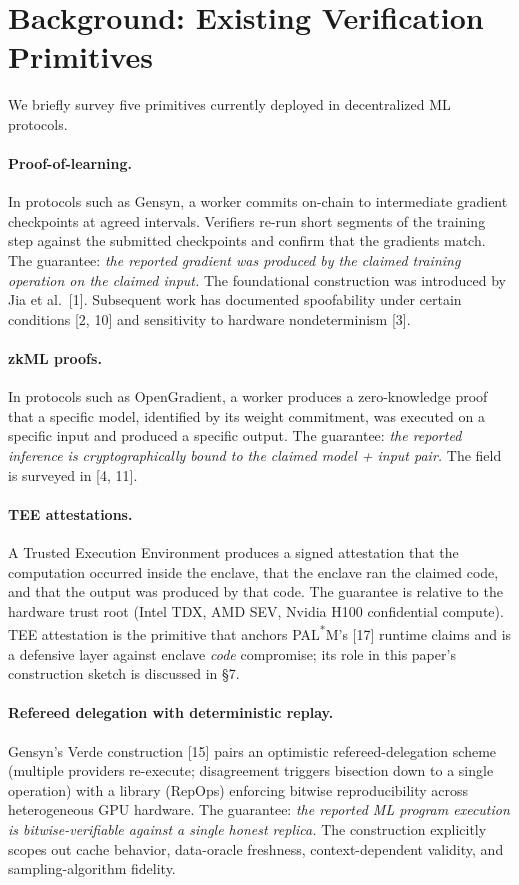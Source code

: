 \documentclass[11pt]{article}
\begin{document}
\section{Background: Existing Verification Primitives}

We briefly survey five primitives currently deployed in decentralized ML protocols.

\paragraph{Proof-of-learning.} In protocols such as Gensyn, a worker commits on-chain to intermediate gradient checkpoints at agreed intervals. Verifiers re-run short segments of the training step against the submitted checkpoints and confirm that the gradients match. The guarantee: \emph{the reported gradient was produced by the claimed training operation on the claimed input.} The foundational construction was introduced by Jia et al.\ [1]. Subsequent work has documented spoofability under certain conditions [2, 10] and sensitivity to hardware nondeterminism [3].

\paragraph{zkML proofs.} In protocols such as OpenGradient, a worker produces a zero-knowledge proof that a specific model, identified by its weight commitment, was executed on a specific input and produced a specific output. The guarantee: \emph{the reported inference is cryptographically bound to the claimed model + input pair.} The field is surveyed in [4, 11].

\paragraph{TEE attestations.} A Trusted Execution Environment produces a signed attestation that the computation occurred inside the enclave, that the enclave ran the claimed code, and that the output was produced by that code. The guarantee is relative to the hardware trust root (Intel TDX, AMD SEV, Nvidia H100 confidential compute). TEE attestation is the primitive that anchors PAL\textsuperscript{*}M's [17] runtime claims and is a defensive layer against enclave \emph{code} compromise; its role in this paper's construction sketch is discussed in \S7.

\paragraph{Refereed delegation with deterministic replay.} Gensyn's Verde construction [15] pairs an optimistic refereed-delegation scheme (multiple providers re-execute; disagreement triggers bisection down to a single operation) with a library (RepOps) enforcing bitwise reproducibility across heterogeneous GPU hardware. The guarantee: \emph{the reported ML program execution is bitwise-verifiable against a single honest replica.} The construction explicitly scopes out cache behavior, data-oracle freshness, context-dependent validity, and sampling-algorithm fidelity.
\end{document}
